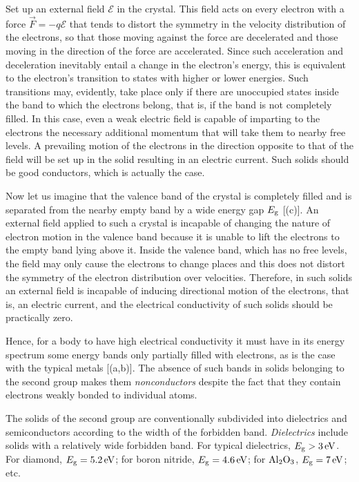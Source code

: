 Set up an external field $\pmb{\mathscr{E}}$ in the crystal. This field acts on every electron with a force $\vec{F}=-q\pmb{\mathscr{E}}$ that tends to distort the symmetry in the velocity distribution of the electrons, so that those moving against the force are decelerated and those moving in the direction of the force are accelerated. Since such acceleration and deceleration
inevitably entail a change in the electron's energy, this is equivalent to the electron's transition to states with higher or lower energies. Such transitions may, evidently, take place only if there are unoccupied states inside the band to which the electrons belong, that is, if the band is not completely filled. In this case, even a weak electric field is capable of imparting to the electrons the necessary additional momentum that will take them to nearby free levels. A prevailing motion of the electrons in the direction opposite to that of the field will be set up in the solid resulting in an electric current. Such solids should be good conductors, which is actually the case.

Now let us imagine that the valence band of the crystal is completely filled and is separated from the nearby empty band by a wide energy gap $E_{\text{g}}$ [(c)]. An external field applied to such a crystal is incapable of changing the nature of electron motion in the valence band because it is unable to lift the electrons to the empty band lying above it. Inside the valence band, which has no free levels, the field may only cause the electrons to change places and this
does not distort the symmetry of the electron distribution over velocities. Therefore, in such solids an external field is incapable of inducing directional motion of the electrons, that is, an electric current, and the electrical conductivity of such solids should be practically zero.

Hence, for a body to have high electrical conductivity it must have in its energy spectrum some energy bands only partially filled with electrons, as is the case with the typical metals [(a,b)]. The absence of such bands in solids belonging to the second group makes them \textit{nonconductors} despite the fact that they contain electrons weakly bonded to individual atoms.

The solids of the second group are conventionally subdivided into dielectrics and semiconductors according to the width of the forbidden band. \textit{Dielectrics} include solids with a relatively wide forbidden band. For typical dielectrics, $E_{\text{g}}>\SI{3}{\electronvolt}$. For diamond, $E_{\text{g}}=\SI{5.2}{\electronvolt}$; for boron nitride, $E_{\text{g}}=\SI{4.6}{\electronvolt}$; for $\ce{Al2O3}$, $E_{\text{g}}=\SI{7}{\electronvolt}$; etc.

